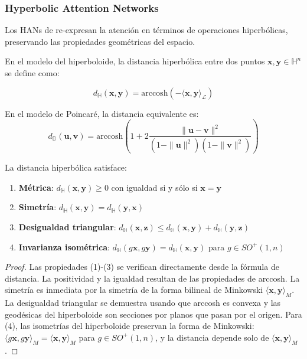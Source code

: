 \subsubsection{Hyperbolic Attention Networks}

Los HANs de \citet{gulcehre2018hyperbolic} re-expresan la atención en términos de operaciones hiperbólicas, preservando las propiedades geométricas del espacio.

\begin{definition}\label{def:distancia_hiperbolica}
En el modelo del hiperboloide, la distancia hiperbólica entre dos puntos $\mathbf{x}, \mathbf{y} \in \mathbb{H}^n$ se define como:

\begin{equation}
    d_{\mathbb{H}}(\mathbf{x}, \mathbf{y}) = \text{arccosh}(-\langle \mathbf{x}, \mathbf{y} \rangle_{\mathcal{L}})
    \label{eq:hyperbolic_distance}
\end{equation}

En el modelo de Poincaré, la distancia equivalente es:
\begin{equation}
d_{\mathbb{D}}(\mathbf{u}, \mathbf{v}) = \text{arccosh}\left(1 + 2\frac{\|\mathbf{u} - \mathbf{v}\|^2}{(1-\|\mathbf{u}\|^2)(1-\|\mathbf{v}\|^2)}\right)
\end{equation}
\end{definition}

\begin{theorem}\label{thm:propiedades_distancia_hiperbolica}
La distancia hiperbólica satisface:
\begin{enumerate}
    \item \textbf{Métrica}: $d_{\mathbb{H}}(\mathbf{x}, \mathbf{y}) \geq 0$ con igualdad si y sólo si $\mathbf{x} = \mathbf{y}$
    \item \textbf{Simetría}: $d_{\mathbb{H}}(\mathbf{x}, \mathbf{y}) = d_{\mathbb{H}}(\mathbf{y}, \mathbf{x})$
    \item \textbf{Desigualdad triangular}: $d_{\mathbb{H}}(\mathbf{x}, \mathbf{z}) \leq d_{\mathbb{H}}(\mathbf{x}, \mathbf{y}) + d_{\mathbb{H}}(\mathbf{y}, \mathbf{z})$
    \item \textbf{Invarianza isométrica}: $d_{\mathbb{H}}(g\mathbf{x}, g\mathbf{y}) = d_{\mathbb{H}}(\mathbf{x}, \mathbf{y})$ para $g \in SO^+(1,n)$
\end{enumerate}
\end{theorem}

\begin{proof}
Las propiedades (1)-(3) se verifican directamente desde la fórmula de distancia. La positividad y la igualdad resultan de las propiedades de arccosh. La simetría es inmediata por la simetría de la forma bilineal de Minkowski $\langle \mathbf{x}, \mathbf{y} \rangle_M$. La desigualdad triangular se demuestra usando que arccosh es convexa y las geodésicas del hiperboloide son secciones por planos que pasan por el origen. Para (4), las isometrías del hiperboloide preservan la forma de Minkowski: $\langle g\mathbf{x}, g\mathbf{y} \rangle_M = \langle \mathbf{x}, \mathbf{y} \rangle_M$ para $g \in SO^+(1,n)$, y la distancia depende solo de $\langle \mathbf{x}, \mathbf{y} \rangle_M$.
\end{proof}


